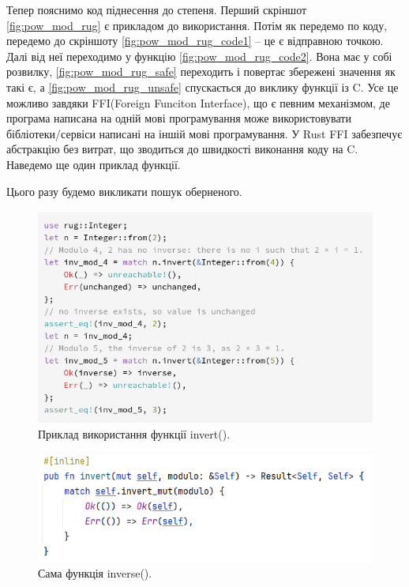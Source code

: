 \begin{itemize}
	Тепер пояснимо код піднесення до степеня. Перший скріншот \ref{fig:pow_mod_rug} є прикладом до використання. Потім як передемо по коду, передемо до скріншоту \ref{fig:pow_mod_rug_code1} -- це є відправною точкою. Далі від неї переходимо у функцію \ref{fig:pow_mod_rug_code2}. Вона має у собі розвилку, \ref{fig:pow_mod_rug_safe} переходить і повертає збережені значення як такі є, а \ref{fig:pow_mod_rug_unsafe} спускається до виклику функції із C. Усе це можливо завдяки FFI(Foreign Funciton Interface), що є певним механізмом, де програма написана на одній мові програмування може використовувати бібліотеки/сервіси написані на іншій мові програмування. У Rust FFI забезпечує абстракцію без витрат, що зводиться до швидкості виконання коду на C. Наведемо ще один приклад функції.
	
	Цього разу будемо викликати пошук оберненого.
	
	\begin{figure}[h]
    		\centering
    		\includegraphics[scale = 0.3]{Images/inverse_rug_example}
    		\caption{Приклад використання функції invert().}
    		\label{fig:inverse_rug_example}
	\end{figure}
	
	\begin{figure}[h]
    		\centering
    		\includegraphics[scale = 0.3]{Images/inverse_rug_code1}
    		\caption{Сама функція inverse().}
    		\label{fig:inverse_rug_code1}
	\end{figure}
	

\end{itemize}

